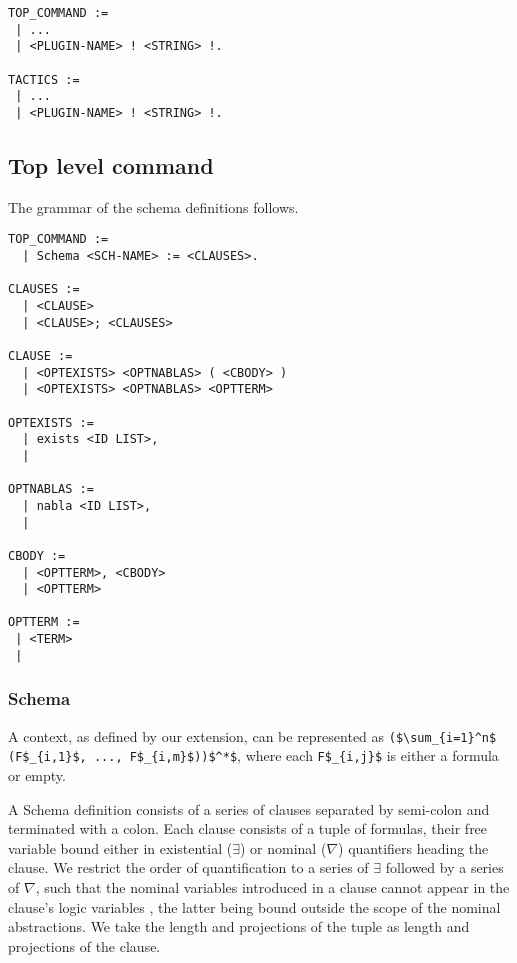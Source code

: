 \documentclass[nocopyrightspace,authoryear]{sigplanconf}
\begin{document}
\begin{lstlisting}
TOP_COMMAND :=
 | ...
 | <PLUGIN-NAME> ! <STRING> !.

TACTICS :=
 | ...
 | <PLUGIN-NAME> ! <STRING> !.
\end{lstlisting}



\subsection{Top level command}
The grammar of the schema definitions follows.

\begin{lstlisting}
TOP_COMMAND :=
  | Schema <SCH-NAME> := <CLAUSES>.

CLAUSES :=
  | <CLAUSE>
  | <CLAUSE>; <CLAUSES>

CLAUSE :=
  | <OPTEXISTS> <OPTNABLAS> ( <CBODY> )
  | <OPTEXISTS> <OPTNABLAS> <OPTTERM>

OPTEXISTS :=
  | exists <ID LIST>, 
  |

OPTNABLAS :=
  | nabla <ID LIST>,
  |

CBODY :=
  | <OPTTERM>, <CBODY>
  | <OPTTERM>

OPTTERM :=
 | <TERM>
 | 
\end{lstlisting} 

\subsubsection{Schema}
A context, as defined by our extension, can be represented as \lstinline|($\sum_{i=1}^n$ (F$_{i,1}$, ..., F$_{i,m}$))$^*$|, where each \lstinline|F$_{i,j}$| is either a formula or empty. 

A Schema definition consists of a series of clauses separated by semi-colon and terminated with a colon. Each clause consists of a tuple of formulas, their free variable bound either in existential ($\exists$) or  nominal ($\nabla$) quantifiers heading the clause. We restrict the order of quantification to a series of $\exists$ followed by a series of $\nabla$, such that the nominal variables introduced in a clause cannot appear in the clause's logic variables , the latter being bound outside the scope of the nominal abstractions. We take the length and projections of the tuple as length and projections of the clause.
\end{document}
